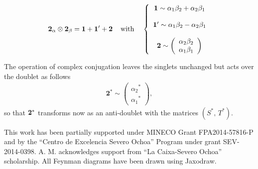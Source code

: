 \documentclass[a4paper,11pt]{article}
\begin{document}
\begin{equation}
\mathbf{2}_\alpha\otimes\mathbf{2}_\beta = \mathbf{1}+\mathbf{1'}+\mathbf{2} \hspace{4mm}\mathrm{with}\hspace{4mm}  
\left\lbrace
\begin{array}{c} 
\mathbf{1}\sim \alpha_1\beta_2+\alpha_2\beta_1 \\ 
\cr
\mathbf{1'} \sim \alpha_1\beta_2-\alpha_2\beta_1 \\
\cr
\mathbf{2} \sim \left(\begin{array}{c} \alpha_2\beta_2 \\ \alpha_1\beta_1 \end{array}\right)\\
\end{array}\right.
\end{equation}

The operation of complex conjugation leaves the singlets unchanged but acts over the doublet as follows
\begin{equation}
\begin{split}
\mathbf{2}^* \sim \left(\begin{array}{c} {\alpha_2}^* \\ {\alpha_1}^*\end{array} \right),
\end{split}
\end{equation}
so that ${\bf 2}^*$ transforms now as an anti-doublet with the matrices $(S^*,\, T^*)$.

\acknowledgments
This work has been partially supported under MINECO Grant FPA2014-57816-P and by the ``Centro de Excelencia Severo Ochoa'' Program under grant SEV-2014-0398. A. M. acknowledges support from ``La Caixa-Severo Ochoa'' scholarship. All Feynman diagrams have been drawn using Jaxodraw\cite{Binosi:2003yf,Binosi:2008ig}.




\end{document}
